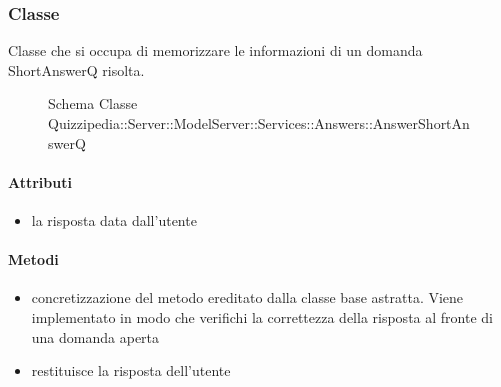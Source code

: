 \subsubsection{Classe }
Classe che si occupa di memorizzare le informazioni di un domanda ShortAnswerQ risolta.
\begin{figure}[H]
\centering
\noindent{}
\caption[Schema Classe AnswerShortAnswerQ]{Schema Classe Quizzipedia::Server::ModelServer::Services::Answers::AnswerShortAnswerQ}
\end{figure}
\paragraph{Attributi}
\begin{itemize}
\item {}
\newline
la risposta data dall'utente
\end{itemize}
\paragraph{Metodi}
\begin{itemize}
\item {}
\newline
concretizzazione del metodo ereditato dalla classe base astratta. Viene implementato in modo che verifichi la correttezza della risposta al fronte di una domanda aperta
\newline
\item {}
\newline
restituisce la risposta dell'utente
\newline
\end{itemize}
